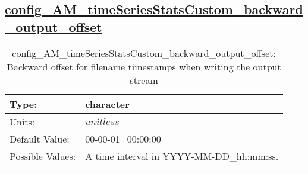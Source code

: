 \subsection[config\_AM\_timeSeriesStatsCustom\_backward\_output\_offset]{\hyperref[sec:nm_tab_AM_timeSeriesStatsCustom]{config\_AM\_timeSeriesStatsCustom\_backward\_output\_offset}}
\label{subsec:nm_sec_config_AM_timeSeriesStatsCustom_backward_output_offset}
\begin{center}
\begin{longtable}{| p{2.0in} || p{4.0in} |}
    \hline
    Type: & character \\
    \hline
    Units: & $unitless$ \\
    \hline
    Default Value: & 00-00-01\_00:00:00 \\
    \hline
    Possible Values: & A time interval in YYYY-MM-DD\_hh:mm:ss. \\
    \hline
    \caption{config\_AM\_timeSeriesStatsCustom\_backward\_output\_offset: Backward offset for filename timestamps when writing the output stream}
\end{longtable}
\end{center}
